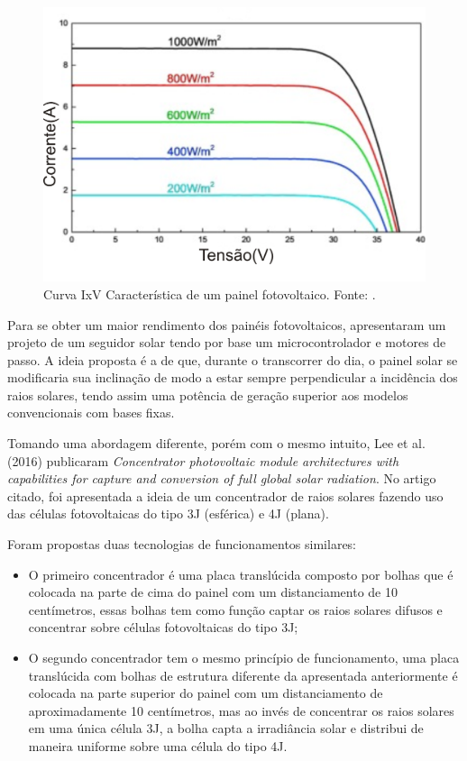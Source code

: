 \FloatBarrier
\begin{figure}[htbp]
	\centering
	\includegraphics[scale=1.3]{imagens/IV_Gao}
	\caption{Curva IxV Característica de um painel fotovoltaico. Fonte:  \cite{GAO201852}.  }
	
	\label{fig:IVGao}
\end{figure}
\FloatBarrier

Para se obter um maior rendimento dos painéis fotovoltaicos,  apresentaram um projeto de um seguidor solar tendo por base um microcontrolador e motores de passo. A ideia proposta é a de que, durante o transcorrer do dia, o painel solar se modificaria sua inclinação de modo a estar sempre perpendicular a incidência dos raios solares, tendo assim uma potência de geração superior aos modelos convencionais com bases fixas.

Tomando uma abordagem diferente, porém com o mesmo intuito, Lee et al. (2016) publicaram \textit{Concentrator photovoltaic module architectures with capabilities for capture and conversion of full global solar radiation}. No artigo citado, foi apresentada a ideia de um concentrador de raios solares fazendo uso das células fotovoltaicas do tipo 3J (esférica) e 4J (plana). 

Foram propostas duas tecnologias de funcionamentos similares:

\begin{itemize}
	\item O primeiro concentrador é uma placa translúcida composto por bolhas que é colocada na parte de cima do painel com um distanciamento de 10 centímetros, essas bolhas tem como função captar os raios solares difusos e concentrar sobre células fotovoltaicas do tipo 3J;
	\item O segundo concentrador tem o mesmo princípio de funcionamento, uma placa translúcida com bolhas de estrutura diferente da apresentada anteriormente é colocada na parte superior do painel com um distanciamento de aproximadamente 10 centímetros, mas ao invés de concentrar os raios solares em uma única célula 3J, a bolha capta a irradiância solar e distribui de maneira uniforme sobre uma célula do tipo 4J.
\end{itemize}

